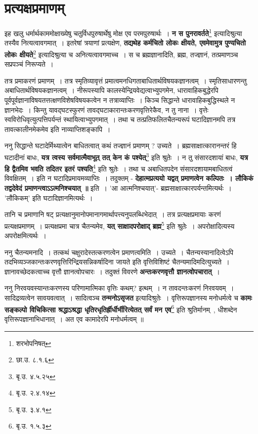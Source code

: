 \section{प्रत्यक्षप्रमाणम्}
	इह खलु धर्मार्थकाममोक्षाख्येषु चतुर्विधपुरुषार्थेषु मोक्ष एव परमपुरुषार्थः~। {\bfseries न स पुनरावर्तते}\footnote{शरभोपनिषत्} इत्यादिश्रुत्या तस्यैव नित्यत्वावगमात्~। इतरेषां त्रयाणां प्रत्यक्षेण, {\bfseries तद्यथेह कर्मचितो लोकः क्षीयते, एवमेवामुत्र पुण्यचितो लोकः क्षीयते}\footnote{छा.उ. ८.१.६} इत्यादिश्रुत्या च अनित्यत्वावगमाच्च~। स च ब्रह्मज्ञानादिति, ब्रह्म, तज्ज्ञानं, तत्प्रमाणञ्च सप्रपञ्चं निरूप्यते~। \par
	तत्र प्रमाकरणं प्रमाणम्~। तत्र स्मृतिव्यावृत्तं प्रमात्वमनधिगताबाधितार्थविषयकज्ञानत्वम्~। स्मृतिसाधारणन्तु अबाधितार्थविषयकज्ञानत्वम्~। नीरूपस्यापि कालस्येन्द्रियवेद्यत्वाभ्युपगमेन, धारावाहिकबुद्धेरपि पूर्वपूर्वज्ञानाविषयतत्तत्क्षणविशेषविषयकत्वेन न तत्राव्याप्तिः~। किञ्च सिद्धान्ते धारावाहिकबुद्धिस्थले न ज्ञानभेदः~। किन्तु यावद्घटस्फुरणं तावद्घटाकारान्तःकरणवृत्तिरेकैव, न तु नाना~। वृत्तेः स्वविरोधिवृत्युत्पत्तिपर्यन्तं स्थायित्वाभ्युपगमात्~। तथा च तत्प्रतिफलितचैतन्यरूपं घटादिज्ञानमपि तत्र तावत्कालीनमेकमेव इति नाव्याप्तिशङ्कापि~।\par
	ननु सिद्धान्ते घटादेर्मिथ्यात्वेन बाधितत्वात् कथं तज्ज्ञानं प्रमाणम् ? उच्यते~। ब्रह्मसाक्षात्कारानन्तरं हि घटादीनां बाधः, {\bfseries यत्र त्वस्य सर्वमात्मैवाभूत् तत् केन कं पश्येत्}\footnote{बृ.उ. ४.५.२५} इति श्रुतेः~। न तु संसारदशायां बाधः, {\bfseries यत्र हि द्वैतमिव भवति तदितर इतरं पश्यति}\footnote{बृ.उ. २.४.१४} इति श्रुतेः~। तथा च अबाधितपदेन संसारदशायामबाधितत्वं विवक्षितम्~। इति न घटादिप्रमायमव्याप्तिः~। तदुक्तम् - {\bfseries देहात्मप्रत्ययो यद्वत् प्रमाणत्वेन कल्पितः~। लौकिकं तद्वदेवेदं प्रमाणन्त्वाऽऽत्मनिश्चयात् ॥} इति~। 'आ आत्मनिश्चयात्'- ब्रह्मसाक्षात्कारपर्यन्तमित्यर्थः~। 'लौकिकम्' इति घटादिज्ञानमित्यर्थः~।\par
	तानि च प्रमाणानि षट् प्रत्यक्षानुमानोपमानागमार्थापत्त्यनुपलब्धिभेदात्~। तत्र प्रत्यक्षप्रमायाः करणं प्रत्यक्षप्रमाणम्~। प्रत्यक्षप्रमा चात्र चैतन्यमेव, {\bfseries यत् साक्षादपरोक्षाद् ब्रह्म}\footnote{बृ.उ. ३.४.१} इति श्रुतेः~। अपरोक्षादित्यस्य अपरोक्षमित्यर्थः~। \par
	ननु चैतन्यमनादि~। तत्कथं चक्षुरादेस्तत्करणत्वेन प्रमाणत्वमिति~। उच्यते~। चैतन्यस्यानादित्वेऽपि तदभिव्यञ्जकान्तःकरणवृत्तिरिन्द्रियसन्निकर्षादिना जायते इति वृत्तिविशिष्टं चैतन्यमादिमदित्युच्यते~। ज्ञानावच्छेदकत्वाच्च वृत्तौ ज्ञानत्वोपचारः~। तदुक्तं विवरणे {\bfseries अन्तःकरणवृत्तौ ज्ञानत्वोपचारात्}~। \par 
	ननु निरवयवस्यान्तःकरणस्य परिणामात्मिका वृत्तिः कथम्? इत्थम्~। न तावदन्तःकरणं निरवयवम्~। सादिद्रव्यत्वेन सावयवत्वात्~। सादित्वञ्च {\bfseries तन्मनोऽसृजत} इत्यादिश्रुतेः~। वृत्तिरूपज्ञानस्य मनोधर्मत्वे च {\bfseries कामः सङ्कल्पो विचिकित्सा श्रद्धाऽश्रद्धा धृतिरधृतिर्ह्रीर्धीर्भीरित्येतत् सर्वं मन एव}\footnote{बृ.उ. १.५.३} इति श्रुतिर्मानम्~, धीशब्देन वृत्तिरूपज्ञानाभिधानात्~। अत एव कामादेरपि मनोधर्मत्वम् ॥ \par
